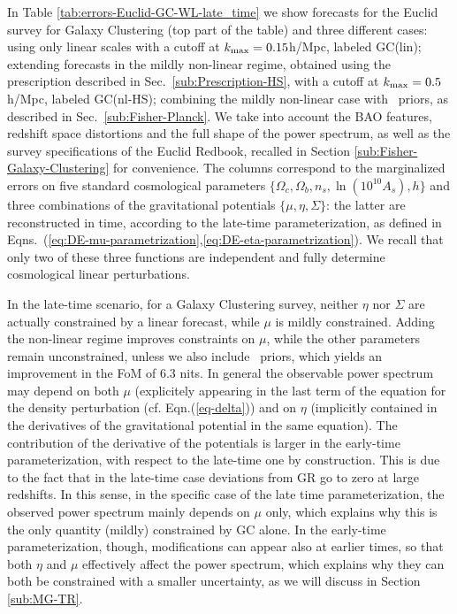 \done{}
In Table \ref{tab:errors-Euclid-GC-WL-late_time} we show forecasts for the Euclid survey \cite{laureijs_euclid_2011} for Galaxy Clustering (top part of the table) and three different cases: using only linear scales with a cutoff at $k_{\rm max}=0.15$h/Mpc, labeled GC(lin); extending forecasts in the mildly non-linear regime, obtained using the prescription described in Sec.\ \ref{sub:Prescription-HS}, with a cutoff at $k_{\rm max}=0.5$ h/Mpc, labeled GC(nl-HS); combining the mildly non-linear case with \planck\ priors, as described in Sec.\ \ref{sub:Fisher-Planck}. We take into account
the BAO features, redshift space distortions and the full shape of
the power spectrum, as well as the survey specifications of the Euclid Redbook, recalled
in Section \ref{sub:Fisher-Galaxy-Clustering} for convenience. The columns correspond to the marginalized errors on five standard cosmological parameters $\{\Omega_c, \Omega_b, n_s, \ln (10^{10} A_s), h\}$ and three combinations of the gravitational potentials $\{\mu, \eta, \Sigma\}$: the latter are reconstructed in time, according to the late-time parameterization, as defined in Eqns.\ (\ref{eq:DE-mu-parametrization},\ref{eq:DE-eta-parametrization}). We recall that only two of these three functions are independent and fully determine cosmological linear perturbations.

In the late-time scenario, for a Galaxy Clustering survey,  
neither $\eta$ nor $\Sigma$ are actually
constrained by a linear forecast, while $\mu$ is mildly constrained.  
Adding the non-linear regime improves constraints on $\mu$, while the other parameters remain unconstrained, 
unless we also include \planck\ priors, which yields an improvement in the FoM of 6.3 nits. In general the observable power spectrum may depend on both $\mu$ (explicitely appearing in the last term of the equation for the density perturbation (cf. Eqn.(\ref{eq-delta})) and on $\eta$ (implicitly contained in the derivatives of the gravitational potential in the same equation). The contribution of the derivative of the potentials is larger in the early-time parameterization, with respect to the late-time one by construction. This is due to the fact that in the late-time case deviations from GR go to zero at large redshifts. In this sense, in the specific case of the late time parameterization, the observed power spectrum mainly depends on $\mu$ only, which explains why this is the only quantity (mildly) constrained by GC alone. In the early-time parameterization, though, modifications can appear also at earlier times, so that both $\eta$ and $\mu$ effectively affect the power spectrum, which explains why they can both be constrained with a smaller uncertainty, as we will discuss in Section \ref{sub:MG-TR}.

